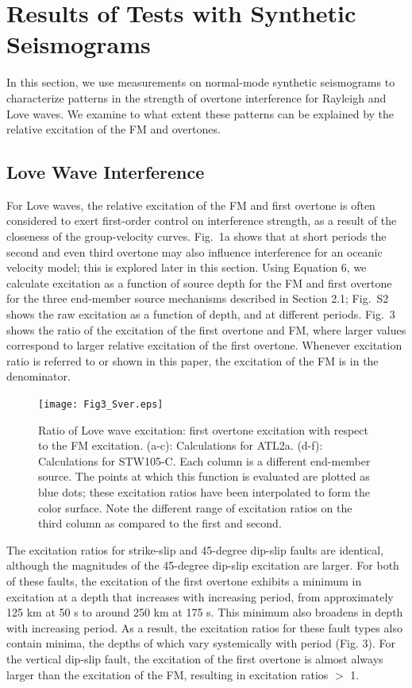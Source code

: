 \documentclass[extra,mreferee]{gji}
\begin{document}
\section{Results of Tests with Synthetic Seismograms}

In this section, we use measurements on normal-mode synthetic seismograms to characterize patterns in the strength of overtone interference for Rayleigh and Love waves. We examine to what extent these patterns can be explained by the relative excitation of the FM and overtones. 
\subsection{Love Wave Interference}
 
For Love waves, the relative excitation of the FM and first overtone is often considered to exert first-order control on interference strength, as a result of the closeness of the group-velocity curves. Fig.\ 1a shows that at short periods the second and even third overtone may also influence interference for an oceanic velocity model; this is explored later in this section. Using Equation 6, we  calculate excitation as a function of source depth for the FM and first overtone for the three end-member source mechanisms described in Section 2.1; Fig.\ S2 shows the raw excitation as a function of depth, and at different periods. Fig.\ 3 shows the ratio of the excitation of the first overtone and FM, where larger values correspond to larger relative excitation of the first overtone. Whenever excitation ratio is referred to or shown in this paper, the excitation of the FM is in the denominator.
\begin{figure}
\texttt{[image: Fig3\_Sver.eps]}
\caption{Ratio of Love wave excitation: first overtone excitation with respect to the FM excitation. (a-c): Calculations for ATL2a. (d-f): Calculations for STW105-C. Each column is a different end-member source. The points at which this function is evaluated are plotted as blue dots; these excitation ratios have been interpolated to form the color surface. Note the different range of excitation ratios on the third column as compared to the first and second.}
\end{figure}
The excitation ratios for strike-slip and 45-degree dip-slip faults are identical, although the magnitudes of the 45-degree dip-slip excitation are larger. For both of these faults, the excitation of the first overtone exhibits a minimum in excitation at a depth that increases with increasing period, from approximately 125 km at 50 s to around 250 km at 175 s. This minimum also broadens in depth with increasing period. As a result, the excitation ratios for these fault types also contain minima, the depths of which vary systemically with period (Fig. 3). For the vertical dip-slip fault, the excitation of the first overtone is almost always larger than the excitation of the FM, resulting in excitation ratios $>$ 1. 
\end{document}
